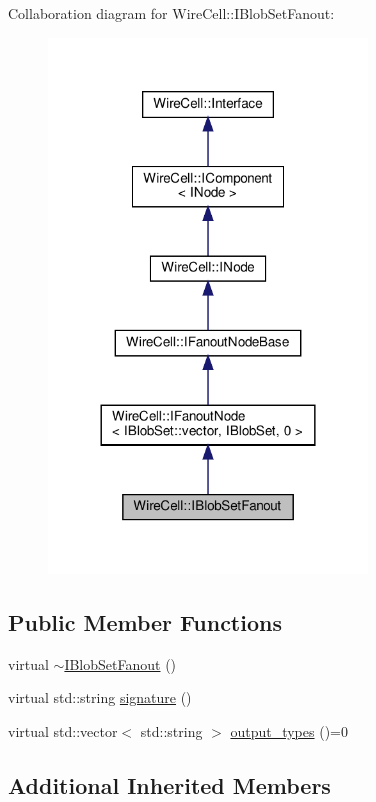 Collaboration diagram for Wire\+Cell\+:\+:I\+Blob\+Set\+Fanout\+:
\nopagebreak
\begin{figure}[H]
\begin{center}
\leavevmode
\includegraphics[width=240pt]{class_wire_cell_1_1_i_blob_set_fanout__coll__graph}
\end{center}
\end{figure}
\subsection*{Public Member Functions}
\begin{DoxyCompactItemize}
\item 
virtual \hyperlink{class_wire_cell_1_1_i_blob_set_fanout_a8bb9aaa91ec385489ff42f8d8d1e3f35}{$\sim$\+I\+Blob\+Set\+Fanout} ()
\item 
virtual std\+::string \hyperlink{class_wire_cell_1_1_i_blob_set_fanout_aa5b7abf68906984b11c7f6fe4bc1cf26}{signature} ()
\item 
virtual std\+::vector$<$ std\+::string $>$ \hyperlink{class_wire_cell_1_1_i_blob_set_fanout_ad70f90237cc742ff5bdac87c661ed644}{output\+\_\+types} ()=0
\end{DoxyCompactItemize}
\subsection*{Additional Inherited Members}


